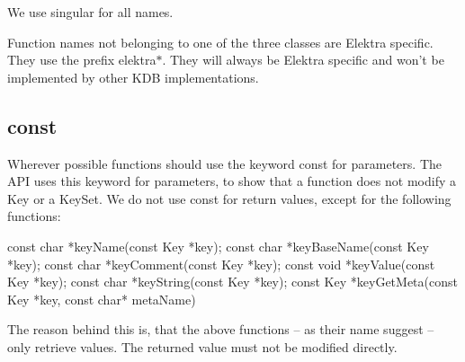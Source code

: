We use singular for all names.

Function names not belonging to one of the three classes are Elektra specific. They use the prefix {\ttfamily elektra$\ast$}. They will always be Elektra specific and won't be implemented by other K\+D\+B implementations.

\subsection*{const}

Wherever possible functions should use the keyword {\ttfamily const} for parameters. The A\+P\+I uses this keyword for parameters, to show that a function does not modify a {\ttfamily Key} or a {\ttfamily Key\+Set}. We do not use {\ttfamily const} for return values, except for the following functions\+: \begin{DoxyVerb}    const char *keyName(const Key *key);
    const char *keyBaseName(const Key *key);
    const char *keyComment(const Key *key);
    const void *keyValue(const Key *key);
    const char *keyString(const Key *key);
    const Key  *keyGetMeta(const Key *key, const char* metaName)
\end{DoxyVerb}


The reason behind this is, that the above functions – as their name suggest – only retrieve values. The returned value must not be modified directly. 